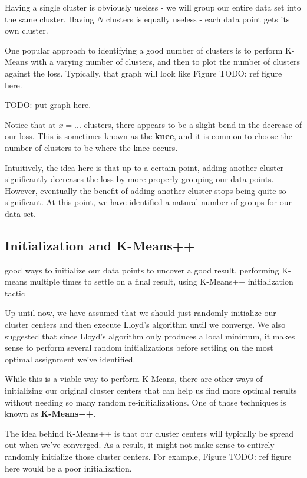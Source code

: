 Having a single cluster is obviously useless - we will group our entire data set into the same cluster. Having $N$ clusters is equally useless - each data point gets its own cluster.

One popular approach to identifying a good number of clusters is to perform K-Means with a varying number of clusters, and then to plot the number of clusters against the loss. Typically, that graph will look like Figure TODO: ref figure here.

TODO: put graph here.

Notice that at $x=...$ clusters, there appears to be a slight bend in the decrease of our loss. This is sometimes known as the \textbf{knee}, and it is common to choose the number of clusters to be where the knee occurs.

Intuitively, the idea here is that up to a certain point, adding another cluster significantly decreases the loss by more properly grouping our data points. However, eventually the benefit of adding another cluster stops being quite so significant. At this point, we have identified a natural number of groups for our data set.

\subsection{Initialization and K-Means++}
good ways to initialize our data points to uncover a good result, performing K-means multiple times to settle on a final result, using K-Means++ initialization tactic

Up until now, we have assumed that we should just randomly initialize our cluster centers and then execute Lloyd's algorithm until we converge. We also suggested that since Lloyd's algorithm only produces a local minimum, it makes sense to perform several random initializations before settling on the most optimal assignment we've identified.

While this is a viable way to perform K-Means, there are other ways of initializing our original cluster centers that can help us find more optimal results without needing so many random re-initializations. One of those techniques is known as \textbf{K-Means++}.

The idea behind K-Means++ is that our cluster centers will typically be spread out when we've converged. As a result, it might not make sense to entirely randomly initialize those cluster centers. For example, Figure TODO: ref figure here would be a poor initialization.

